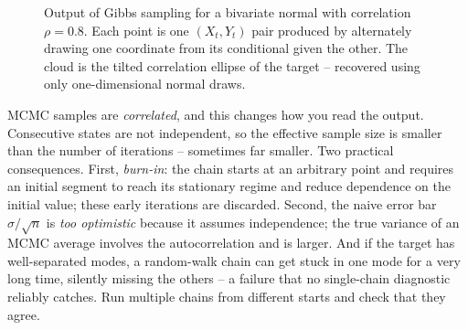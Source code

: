 \begin{figure}[H]
\centering
{}
\caption{Output of Gibbs sampling for a bivariate normal with correlation
$\rho=0.8$. Each point is one $(X_t,Y_t)$ pair produced by alternately drawing one
coordinate from its conditional given the other. The cloud is the tilted
correlation ellipse of the target -- recovered using only one-dimensional normal
draws.}
\label{ch35:fig-gibbs-cloud}
\end{figure}

\begin{trapbox}
MCMC samples are \emph{correlated}, and this changes how you read the output.
Consecutive states are not independent, so the effective sample size is smaller
than the number of iterations -- sometimes far smaller. Two practical
consequences. First, \emph{burn-in}: the chain starts at an arbitrary point and
requires an initial segment to reach its stationary regime and reduce dependence
on the initial value; these early iterations are discarded.
Second, the naive error bar $\hat\sigma/\sqrt n$ is \emph{too optimistic} because
it assumes independence; the true variance of an MCMC average involves the
autocorrelation and is larger. And if the target has well-separated modes, a
random-walk chain can get stuck in one mode for a very long time, silently
missing the others -- a failure that no single-chain diagnostic reliably catches.
Run multiple chains from different starts and check that they agree.
\end{trapbox}

